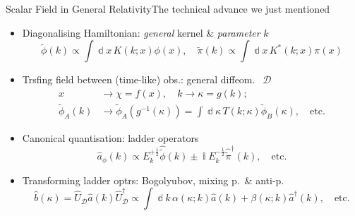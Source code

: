 \documentclass{beamer}
\newcommand{\ii}{{\Bbbi}}
\newcommand{\rfun}[2]{{#1}\mathopen{}\left(#2\right)\mathclose{}}
\newcommand{\dif}{\Bbbd}
\newcommand{\what}[1]{{\widehat{#1}}}
\begin{document}
\begin{frame}{Scalar Field in General Relativity}{The technical advance
we just mentioned}
\begin{itemize}
\item Diagonalising Hamiltonian: \emph{general} kernel \& \emph{parameter} $k$
\[
\rfun{\tilde{\phi}}{k} \propto \int \dif x\,\rfun{K}{k;x} \rfun{\phi}{x},
\quad
\rfun{\tilde{\pi}}{k} \propto \int \dif x\,\rfun{K^*}{k;x} \rfun{\pi}{x}
\]
\item Trsfing field between (time-like) obs.: general diffeom.\ $\mscrD$
\begin{align*}
x &\to \chi = \rfun{f}{x},\quad k \to \kappa = \rfun{g}{k};
\\
\rfun{\tilde{\phi}_A}{k} &\to \rfun{\tilde{\phi}_A}{\rfun{g^{-1}}{\kappa}}
=\int \dif \kappa\,\rfun{T}{k;\kappa}\rfun{\tilde{\phi}_B}{\kappa},
\quad \text{etc.}
\end{align*}
\item Canonical quantisation: ladder operators
\[ \rfun{\what{a}_\phi}{k} \propto
E_k^{+\frac{1}{2}}\rfun{\what{\tilde{\phi}}}{k}
\pm \ii E_k^{-\frac{1}{2}}\rfun{\what{\tilde{\pi}}^\dagger}{k},
\quad \text{etc.}\]
\item Transforming ladder optrs: \alert{Bogolyubov}, \alert{mixing} p.\ \& anti-p.\
\[
\rfun{\what{b}}{\kappa}
= \what{U}_\mscrD \rfun{\what{a}}{k}\what{U}^\dagger_\mscrD
\propto \int \dif k\,\rfun{\alpha}{\kappa;k} \rfun{\what{a}}{k}
+ \rfun{\beta}{\kappa;k} \rfun{\what{a}^\dagger}{k},
\quad\text{etc.}
\]
\end{itemize}
\end{frame}
\end{document}
